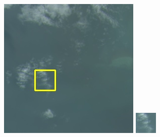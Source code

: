 \documentclass[UTF8]{ctexart}
\begin{document}
\begin{figure}[H]
{\begin{minipage}[b]{0.15\linewidth}
            \vspace{4pt}
            \includegraphics[width=1\linewidth]{../log/cut/LC81620432014072LGN00_16101_color.jpg}\vspace{4pt}
            \includegraphics[width=1\linewidth]{../log/cut/tmp_cut_LC81620432014072LGN00_16101_color.jpg}

\end{minipage}}
\end{figure}
\end{document}
